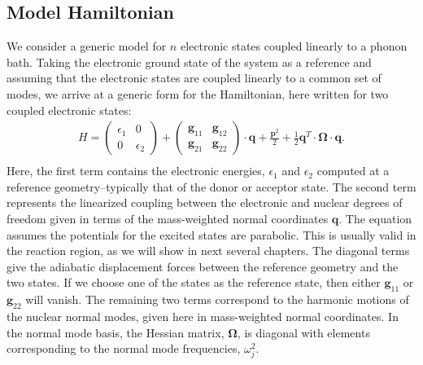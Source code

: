 \subsection{Model Hamiltonian}
We consider a generic model for $n$ electronic states coupled linearly
to a phonon bath.  Taking the electronic ground state of the system as a reference
and assuming that the electronic states are coupled linearly to a common set of
 modes, we arrive at a generic form for the Hamiltonian, here written for two coupled electronic states:
 \begin{eqnarray}
H=\left(\begin{array}{cc}
\epsilon_{1} & 0\\
0 & \epsilon_{2}
\end{array}\right)+\left(\begin{array}{cc}
{\mathbf g}_{11}&{\mathbf g}_{12} \\
{\mathbf g}_{21} &{\mathbf g}_{22}
\end{array}\right)\cdot{\mathbf q} +\frac{{\mathbf p}^{2}}{2}+\frac{1}{2}\mathbf{q}^{T}\cdot\mathbf\Omega\cdot\mathbf{q}.
\nonumber \\
\label{ham1}
\end{eqnarray}
Here, the first term contains the electronic energies, $\epsilon_{1}$ and $\epsilon_{2}$ computed at a
reference geometry--typically that of the donor or acceptor state.   The second term represents the
linearized coupling between the electronic and nuclear degrees of freedom given in terms of the mass-weighted
normal coordinates $\mathbf q$. The equation assumes the potentials for the excited states are parabolic. This is usually valid in the reaction region, as we will show in next several chapters.  The diagonal terms
give the adiabatic displacement forces between the reference geometry and the two states.  If we choose one of the
states as the reference state, then either $\mathbf g_{11}$ or $\mathbf g_{22}$ will vanish.
The remaining two terms correspond to the harmonic motions of the nuclear normal modes, given here in mass-weighted normal coordinates.
In the normal mode basis, the Hessian matrix, $\mathbf \Omega$,  is diagonal with elements corresponding to the normal mode frequencies, $\omega_{j}^{2}$.


